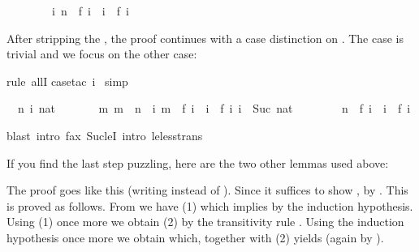 \begin{isabellebody}
\begin{isamarkuptxt}
\begin{isabelle}
\ \ \ \ \ \ \ \ {\isasymforall}i{\isachardot}\ n\ {\isacharequal}\ f\ i\ {\isasymlongrightarrow}\ i\ {\isasymle}\ f\ i%
\end{isabelle}
After stripping the , the proof continues with a case
distinction on . The case  is trivial and we focus on
the other case:%
\end{isamarkuptxt}%
rule\ allI{\isacharparenright}\isanewline
{}case{\isacharunderscore}tac\ i{\isacharparenright}\isanewline
\ simp{\isacharparenright}%
\begin{isamarkuptxt}%
\begin{isabelle}%
\ {}{\isachardot}\ {\isasymAnd}n\ i\ nat{\isachardot}\isanewline
\ \ \ \ \ \ \ {\isasymlbrakk}{\isasymforall}m{\isachardot}\ m\ {\isacharless}\ n\ {\isasymlongrightarrow}\ {\isacharparenleft}{\isasymforall}i{\isachardot}\ m\ {\isacharequal}\ f\ i\ {\isasymlongrightarrow}\ i\ {\isasymle}\ f\ i{\isacharparenright}{\isacharsemicolon}\ i\ {\isacharequal}\ Suc\ nat{\isasymrbrakk}\isanewline
\ \ \ \ \ \ \ {\isasymLongrightarrow}\ n\ {\isacharequal}\ f\ i\ {\isasymlongrightarrow}\ i\ {\isasymle}\ f\ i%
\end{isabelle}%
\end{isamarkuptxt}%
blast\ intro{\isacharbang}{\isacharcolon}\ f{\isacharunderscore}ax\ Suc{\isacharunderscore}leI\ intro{\isacharcolon}\ le{\isacharunderscore}less{\isacharunderscore}trans{\isacharparenright}%
\begin{isamarkuptext}%
\noindent
If you find the last step puzzling, here are the 
two other lemmas used above:
\begin{isabelle}
\isanewline
{}
\end{isabelle}
%
The proof goes like this (writing  instead of ).
Since  it suffices to show
\hbox{},
by \@.  This is
proved as follows. From  we have 
(1) which implies  by the induction hypothesis.
Using (1) once more we obtain  (2) by the transitivity
rule .
Using the induction hypothesis once more we obtain 
which, together with (2) yields  (again by
).


\end{isamarkuptext}
\end{isabellebody}
